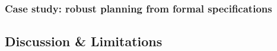 

\subsubsection{Case study: robust planning from formal specifications}





\subsection{Discussion \& Limitations}



